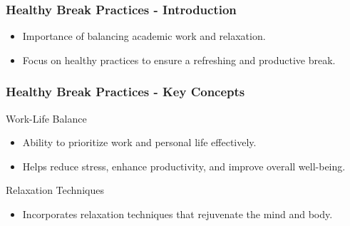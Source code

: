 \documentclass[aspectratio=169]{beamer}
\begin{document}
\begin{frame}[fragile]
  \frametitle{Healthy Break Practices - Introduction}
  \begin{itemize}
    \item Importance of balancing academic work and relaxation.
    \item Focus on healthy practices to ensure a refreshing and productive break.
  \end{itemize}
\end{frame}

\begin{frame}[fragile]
  \frametitle{Healthy Break Practices - Key Concepts}
  \begin{block}{Work-Life Balance}
    \begin{itemize}
      \item Ability to prioritize work and personal life effectively.
      \item Helps reduce stress, enhance productivity, and improve overall well-being.
    \end{itemize}
  \end{block}
  
  \begin{block}{Relaxation Techniques}
    \begin{itemize}
      \item Incorporates relaxation techniques that rejuvenate the mind and body.
    \end{itemize}
  \end{block}
\end{frame}
\end{document}
